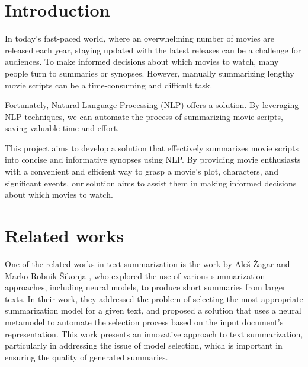 \documentclass[fleqn,moreauthors,10pt]{ds_report}
\affiliation{\textit{Advisors: Slavko Žitnik, Aleš Žagar}}
\begin{document}
\flushbottom 

\maketitle 

\thispagestyle{empty} 


\section*{Introduction}

In today's fast-paced world, where an overwhelming number of movies are released each year, staying updated with the latest releases can be a challenge for audiences. To make informed decisions about which movies to watch, many people turn to summaries or synopses. However, manually summarizing lengthy movie scripts can be a time-consuming and difficult task.

Fortunately, Natural Language Processing (NLP) offers a solution. By leveraging NLP techniques, we can automate the process of summarizing movie scripts, saving valuable time and effort.

This project aims to develop a solution that effectively summarizes movie scripts into concise and informative synopses using NLP. By providing movie enthusiasts with a convenient and efficient way to grasp a movie's plot, characters, and significant events, our solution aims to assist them in making informed decisions about which movies to watch.


\section*{Related works}

One of the related works in text summarization is the work by Aleš Žagar and Marko  Robnik-Šikonja \cite{zagar2022}, who explored the use of various summarization approaches, including neural models, to produce short summaries from larger texts. In their work, they addressed the problem of selecting the most appropriate summarization model for a given text, and proposed a solution that uses a neural metamodel to automate the selection process based on the input document's representation. This work presents an innovative approach to text summarization, particularly in addressing the issue of model selection, which is important in ensuring the quality of generated summaries.
\end{document}
